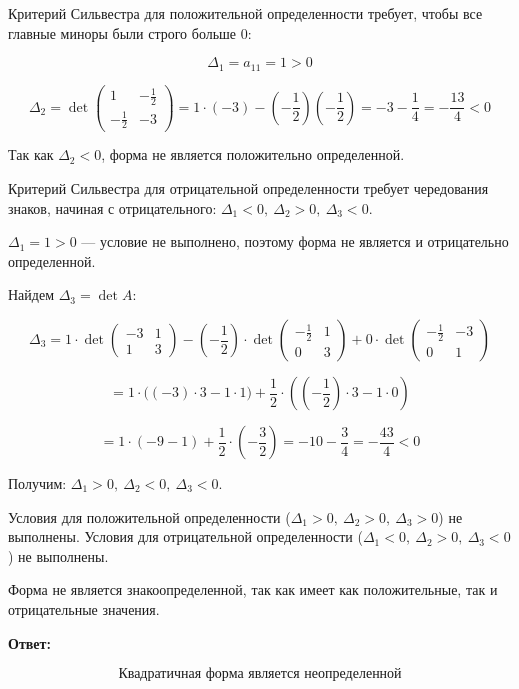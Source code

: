 \documentclass[12pt,final,oneside]{extreport}%
\begin{document}
Критерий Сильвестра для положительной определенности требует, чтобы все главные миноры были строго больше 0:

\[
\Delta_1 = a_{11} = 1 > 0
\]

\[
\Delta_2 = \det\begin{pmatrix}1 & -\frac12 \\ -\frac12 & -3\end{pmatrix}
= 1 \cdot (-3) - \left(-\frac12\right)\left(-\frac12\right) = -3 - \frac14 = -\frac{13}{4} < 0
\]

Так как \(\Delta_2 < 0\), форма не является положительно определенной.

Критерий Сильвестра для отрицательной определенности требует чередования знаков, начиная с отрицательного:
\(\Delta_1 < 0,\ \Delta_2 > 0,\ \Delta_3 < 0\).

\(\Delta_1 = 1 > 0\) — условие не выполнено, поэтому форма не является и отрицательно определенной.

Найдем \(\Delta_3 = \det A\):

\[
\Delta_3 = 1 \cdot \det\begin{pmatrix} -3 & 1 \\ 1 & 3 \end{pmatrix}
- \left(-\frac12\right) \cdot \det\begin{pmatrix} -\frac12 & 1 \\ 0 & 3 \end{pmatrix}
+ 0 \cdot \det\begin{pmatrix} -\frac12 & -3 \\ 0 & 1 \end{pmatrix}
\]

\[
= 1 \cdot \big( (-3)\cdot 3 - 1\cdot 1 \big) + \frac12 \cdot \left( \left(-\frac12\right)\cdot 3 - 1\cdot 0 \right)
\]

\[
= 1 \cdot (-9 - 1) + \frac12 \cdot \left( -\frac32 \right)
= -10 - \frac34 = -\frac{43}{4} < 0
\]

Получим: \(\Delta_1 > 0,\ \Delta_2 < 0,\ \Delta_3 < 0\).

Условия для положительной определенности (\(\Delta_1>0,\ \Delta_2>0,\ \Delta_3>0\)) не выполнены.
Условия для отрицательной определенности (\(\Delta_1<0,\ \Delta_2>0,\ \Delta_3<0\)) не выполнены.

Форма не является знакоопределенной, так как имеет как положительные, так и отрицательные значения.

\textbf{Ответ:}

\[
\boxed{\text{Квадратичная форма является неопределенной}}
\]
\end{document}
